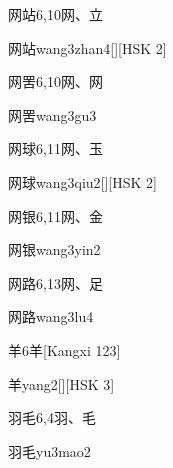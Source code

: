 \begin{entry}{网站}{6,10}{⽹、⽴}
  \begin{phonetics}{网站}{wang3zhan4}[][HSK 2]
  \end{phonetics}
\end{entry}

\begin{entry}{网罟}{6,10}{⽹、⽹}
  \begin{phonetics}{网罟}{wang3gu3}
  \end{phonetics}
\end{entry}

\begin{entry}{网球}{6,11}{⽹、⽟}
  \begin{phonetics}{网球}{wang3qiu2}[][HSK 2]
  \end{phonetics}
\end{entry}

\begin{entry}{网银}{6,11}{⽹、⾦}
  \begin{phonetics}{网银}{wang3yin2}
  \end{phonetics}
\end{entry}

\begin{entry}{网路}{6,13}{⽹、⾜}
  \begin{phonetics}{网路}{wang3lu4}
  \end{phonetics}
\end{entry}

\begin{entry}{羊}{6}{⽺}[Kangxi 123]
  \begin{phonetics}{羊}{yang2}[][HSK 3]
  \end{phonetics}
\end{entry}

\begin{entry}{羽毛}{6,4}{⽻、⽑}
  \begin{phonetics}{羽毛}{yu3mao2}
  \end{phonetics}
\end{entry}

